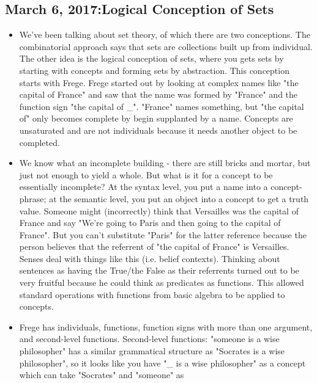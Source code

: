 \documentclass[12pt]{article}
\theoremstyle{definition}
\begin{document}
\subsection{March 6, 2017:Logical Conception of Sets}

\begin{itemize}
    \itemsep0em 
    \item
        We've been talking about set theory, of which there are two
        conceptions. The combinatorial approach says that sets are collections
        built up from individual. The other idea is the logical conception of
        sets, where you gets sets by starting with concepts and forming sets by
        abstraction. This conception starts with Frege. Frege started out by
        looking at complex names like "the capital of France" and saw that the
        name was formed by "France" and the function sign "the capital of \_".
        "France" names something, but "the capital of" only becomes complete by
        begin supplanted by a name. Concepts are unsaturated and are not
        individuals because it needs another object to be completed. 
    \item
        We know what an incomplete building - there are still bricks and
        mortar, but just not enough to yield a whole. But what is it for a
        concept to be essentially incomplete? At the syntax level, you put a
        name into a concept-phrase; at the semantic level, you put an object
        into a concept to get a truth value. Someone might (incorrectly) think
        that Versailles was the capital of France and say "We're going to Paris
        and then going to the capital of France". But you can't substitute
        "Paris" for the latter reference because the person believes that the
        referrent of "the capital of France" is Versailles. Senses deal with
        things like this (i.e. belief contexts). Thinking about sentences as
        having the True/the False as their referrents turned out to be very
        fruitful because he could think as predicates as functions. This
        allowed standard operations with functions from basic algebra to be
        applied to concepts.
    \item
        Frege has individuals, functions, function signs with more than one
        argument, and second-level functions. Second-level functions: "someone
        is a wise philosopher" has a similar grammatical structure as "Socrates
        is a wise philosopher", so it looks like you have "\_ is a wise
        philosopher" as a concept which can take "Socrates" and "someone" as

\end{itemize}
\end{document}
